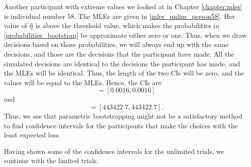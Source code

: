 Another participant with extreme values we looked at in Chapter \ref{chapter:mles} is individual number 58. The MLEs are given in \ref{mles_unlim_person58}. Her value of $\hat{\eta}$ is above the threshold value, which makes the probabilities in \eqref{probabilities_bootstrap} be approximate either zero or one. Thus, when we draw decisions based on those probabilities, we will always end up with the same decisions, and those are the decisions that the participant have made. All the simulated decisions are identical to the decisions the participant has made, and the MLEs will be identical. Thus, the length of the two CIs will be zero, and the values will be equal to the MLEs. Hence, the CIs are
\begin{equation*}
    [\hat{\alpha}^{*(5)}_{1000},\hat{\alpha}^{*(95)}_{1000}] = [0.0016,0.0016]
\end{equation*}
and
\begin{equation*}
    [\hat{\eta}^{*(5)}_{1000},\hat{\eta}^{*(95)}_{1000}] = [443422.7,443422.7].
\end{equation*}
Thus, we see that parametric bootstrapping might not be a satisfactory method to find confidence intervals for the participants that make the choices with the least expected loss. 

Having shown some of the confidence intervals for the unlimited trials, we continue with the limited trials.












